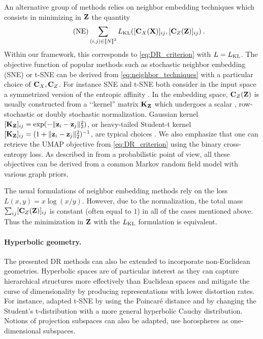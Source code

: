 An alternative group of methods relies on neighbor embedding techniques which consists in minimizing in ${\mathbf{Z}}$ the quantity
\begin{equation}\tag{NE}
	\label{eq:neighbor_techniques}
	\sum_{(i,j) \in {[\![N]\!]}^2} L_{\operatorname{KL}}([{\mathbf{C}}_{X}({\mathbf{X}})]_{ij}, [{\mathbf{C}}_{Z}({\mathbf{Z}})]_{ij}) \:.
\end{equation}
Within our framework, this corresponds to \cref{eq:DR_criterion} with $L = L_{\operatorname{KL}}$. The objective function of popular methods such as stochastic neighbor embedding (SNE) \citep{hinton2002stochastic} or t-SNE \citep{van2008visualizing} can be derived from \cref{eq:neighbor_techniques} with a particular choice of ${\mathbf{C}}_{X}, {\mathbf{C}}_{Z}$. For instance SNE and t-SNE both consider in the input space a symmetrized version of the entropic affinity \citep{vladymyrov2013entropic,van2023snekhorn}. In the embedding space, ${\mathbf{C}}_Z({\mathbf{Z}})$ is usually constructed from a ‘‘kernel'' matrix ${\mathbf{K}}_{\mathbf{Z}}$ which undergoes a scalar \citep{van2008visualizing}, row-stochastic \citep{hinton2002stochastic} or doubly stochastic \citep{lu2019doubly,van2023snekhorn} normalization. Gaussian kernel $[{\mathbf{K}}_{\mathbf{Z}}]_{ij} = \exp(-\|{\mathbf{z}}_i-{\mathbf{z}}_j\|_2^2)$, or heavy-tailed Student-t kernel $[{\mathbf{K}}_{\mathbf{Z}}]_{ij} = (1+\|{\mathbf{z}}_i-{\mathbf{z}}_j\|_2^2)^{-1}$, are typical choices \citep{van2008visualizing}. We also emphasize that one can retrieve the UMAP objective \citep{mcinnes2018umap} from \cref{eq:DR_criterion} using the binary cross-entropy loss. As described in \citep{van2022probabilistic} from a probabilistic point of view, all these objectives can be derived from a common Markov random field model with various graph priors.
\begin{remark}
The usual formulations of neighbor embedding methods rely on the loss $L(x,y) = x \log(x/y)$. However, due to the normalization, the total mass $\sum_{ij} [{\mathbf{C}}_Z({\mathbf{Z}})]_{ij}$ is constant (often equal to $1$) in all of the cases mentioned above. Thus the minimization in ${\mathbf{Z}}$ with the $L_{\operatorname{KL}}$ formulation is equivalent.
\end{remark}

\paragraph{Hyperbolic geometry.} The presented DR methods can also be extended to incorporate non-Euclidean geometries. Hyperbolic spaces \citep{Chami21, Fan_2022_CVPR, Guo22, Lin23} are of particular interest as they can capture hierarchical structures more effectively than Euclidean spaces and mitigate the curse of dimensionality by producing representations with lower distortion rates. 
For instance, \citet{Guo22} adapted t-SNE by using the Poincaré distance and by changing the Student's t-distribution with a more general hyperbolic Cauchy distribution.  Notions of projection subspaces can also be adapted, \eg \citet{Chami21} use horospheres as one-dimensional subspaces. 
